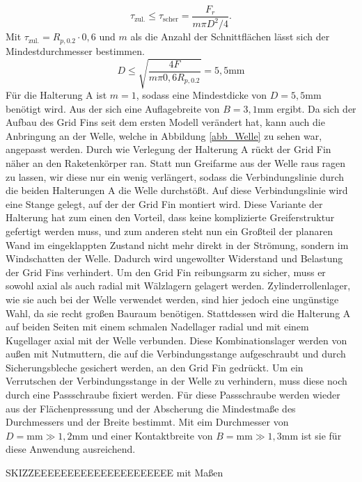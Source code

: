 \begin{equation}
	\tau_{\mathrm{zul.}}\leq\tau_\mathrm{scher}=\frac{F_r}{m\pi D^2/4}.
\end{equation}
Mit $\tau_{\mathrm{zul.}}=R_{p, 0.2}\cdot 0,6$ \cite{metall} und $m$ als die Anzahl der Schnittflächen lässt sich der Mindestdurchmesser bestimmen.
\begin{equation}
	D \leq \sqrt{\frac{4F}{m\pi 0,6 R_{p, 0.2}}}= 5,5\mathrm{mm}
\end{equation}
Für die Halterung A ist $m=1$, sodass eine Mindestdicke von $D=5,5$mm benötigt wird. Aus der sich eine Auflagebreite von $B = 3,1$mm ergibt. Da sich der Aufbau des Grid Fins seit dem ersten Modell verändert hat, kann auch die Anbringung an der Welle, welche in Abbildung \ref{abb_Welle} zu sehen war, angepasst werden. Durch wie Verlegung der Halterung A rückt der Grid Fin näher an den Raketenkörper ran. Statt nun Greifarme aus der Welle raus ragen zu lassen, wir diese nur ein wenig verlängert, sodass die Verbindungslinie durch die beiden Halterungen A die Welle durchstößt. Auf diese Verbindungslinie wird eine Stange gelegt, auf der der Grid Fin montiert wird. Diese Variante der Halterung hat zum einen den Vorteil, dass keine komplizierte Greiferstruktur gefertigt werden muss, und zum anderen steht nun ein Großteil der planaren Wand im eingeklappten Zustand nicht mehr direkt in der Strömung, sondern im Windschatten der Welle. Dadurch wird ungewollter Widerstand und Belastung der Grid Fins verhindert. Um den Grid Fin reibungsarm zu sicher, muss er sowohl axial als auch radial mit Wälzlagern gelagert werden. Zylinderrollenlager, wie sie auch bei der Welle verwendet werden, sind hier jedoch eine ungünstige Wahl, da sie recht großen Bauraum benötigen. Stattdessen wird die Halterung A auf beiden Seiten mit einem schmalen Nadellager radial und mit einem Kugellager axial mit der Welle verbunden. Diese Kombinationslager werden von außen mit Nutmuttern, die auf die Verbindungsstange aufgeschraubt und durch Sicherungsbleche gesichert werden, an den Grid Fin gedrückt. Um ein Verrutschen der Verbindungsstange in der Welle zu verhindern, muss diese noch durch eine Passschraube fixiert werden. Für diese Passschraube werden wieder aus der Flächenpresssung und der Abscherung die Mindestmaße des Durchmessers und der Breite bestimmt. Mit eim Durchmesser von $D = \mathrm{mm}\gg 1,2$mm und einer Kontaktbreite von $B = \mathrm{mm}\gg 1,3$mm ist sie für diese Anwendung ausreichend.

SKIZZEEEEEEEEEEEEEEEEEEEEE mit Maßen

